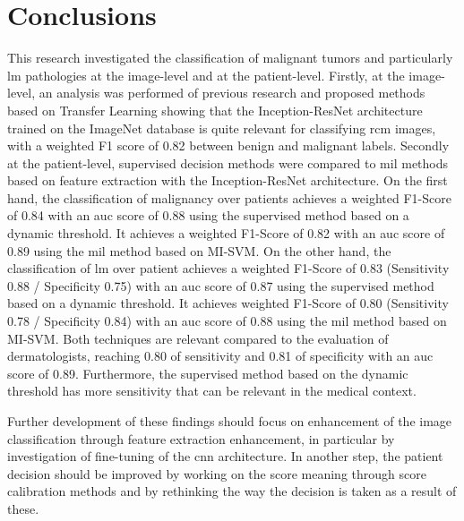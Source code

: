 \documentclass[journal,article,accept,moreauthors,pdftex, applsci]{Definitions/mdpi}
\begin{document}
\section{Conclusions}
\label{sec:conclusions}
This research investigated the classification of malignant tumors and particularly \ac{lm} pathologies at the image-level and at the patient-level. Firstly, at the image-level, an analysis was performed of previous research and proposed methods based on Transfer Learning showing that the Inception-ResNet architecture trained on the ImageNet database is quite relevant for classifying \ac{rcm} images, with a weighted F1 score of 0.82 between benign and malignant labels. Secondly at the patient-level, supervised decision methods were compared to \ac{mil} methods based on feature extraction with the Inception-ResNet architecture. On the first hand, the classification of malignancy over patients achieves a weighted F1-Score of 0.84 with an \ac{auc} score of 0.88 using the supervised method based on a dynamic threshold. It achieves a weighted F1-Score of 0.82 with an \ac{auc} score of 0.89 using the \ac{mil} method based on MI-SVM. On the other hand, the classification of \ac{lm} over patient achieves a weighted F1-Score of 0.83 (Sensitivity 0.88 / Specificity 0.75) with an \ac{auc} score of 0.87 using the supervised method based on a dynamic threshold. It achieves weighted F1-Score of 0.80 (Sensitivity 0.78 / Specificity 0.84) with an \ac{auc} score of 0.88 using the \ac{mil} method based on MI-SVM. Both techniques are relevant compared to the evaluation of dermatologists, reaching 0.80 of sensitivity and 0.81 of specificity with an \ac{auc} score of 0.89. Furthermore, the supervised method based on the dynamic threshold has more sensitivity that can be relevant in the medical context.\par
Further development of these findings should focus on enhancement of the image classification through feature extraction enhancement, in particular by investigation of fine-tuning of the \ac{cnn} architecture. In another step, the patient decision should be improved by working on the score meaning through score calibration methods and by rethinking the way the decision is taken as a result of these.\par

\vspace{10pt} 

\end{document}
